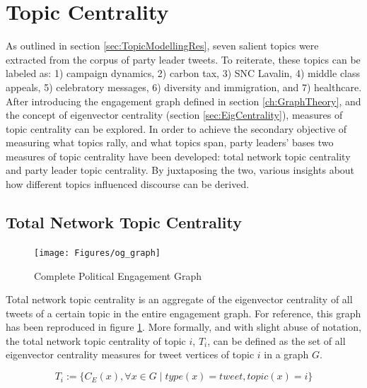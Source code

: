 \section{Topic Centrality}\label{sec:TopicCentrality}

As outlined in section \ref{sec:TopicModellingRes}, seven salient topics were
extracted from the corpus of party leader tweets. To reiterate, these topics can
be labeled as: 1) campaign dynamics, 2) carbon tax, 3) SNC Lavalin, 4) middle
class appeals, 5) celebratory messages, 6) diversity and immigration, and 7)
healthcare. After introducing the engagement graph defined in section
\ref{ch:GraphTheory}, and the concept of eigenvector centrality (section
\ref{sec:EigCentrality}), measures of topic centrality can be explored. In order
to achieve the secondary objective of measuring what topics rally, and what
topics span, party leaders' bases two measures of topic centrality have been
developed: total network topic centrality and party leader topic centrality. By
juxtaposing the two, various insights about how different topics influenced
discourse can be derived.

\subsection{Total Network Topic Centrality}\label{sec:NetTopicCentrality}

\begin{singlespacing}
    \begin{figure}[H]
    \centering
    \texttt{[image: Figures/og\_graph]}
    \caption[Complete Political Engagement Graph]{Complete Political Engagement Graph}
    \label{fig:og_graph_copy}
    \end{figure}
\end{singlespacing}

Total network topic centrality is an aggregate of the eigenvector centrality of
all tweets of a certain topic in the entire engagement graph. For reference,
this graph has been reproduced in figure \ref{fig:og_graph_copy}. More formally,
and with slight abuse of notation, the total network topic centrality of topic
$i$, $T_{i}$, can be defined as the set of all eigenvector centrality measures for tweet
vertices of topic $i$ in a graph $G$. 

\begin{equation}
    T_{i} := \{ C_{E}(x) , \forall x \in G \mid type(x)=tweet, topic(x)=i \}
\end{equation}

